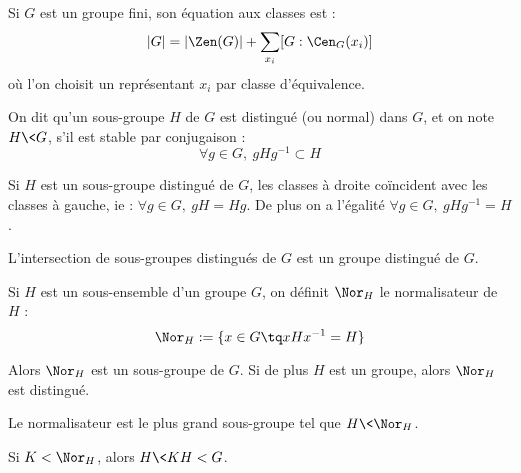 \begin{defi}
 
Si $G$ est un groupe fini, son équation aux classes est :
\begin{displaymath} |G| = |\Zen(G)| + \sum_{x_i} [G : \Cen_G(x_i)]
\end{displaymath}
où l'on choisit un représentant $x_i$ par classe d'équivalence.
\end{defi}

\begin{defi}
 
On dit qu'un sous-groupe $H$ de $G$ est distingué (ou normal) dans $G$, et on
note $H \< G$, s'il est stable par conjugaison :
\begin{displaymath} \forall g\in G,\ gHg^{-1} \subset H \end{displaymath}
\end{defi}

\begin{prop}
 
Si $H$ est un sous-groupe distingué de $G$, les classes à droite coïncident
avec les classes à gauche, ie : $\forall g\in G,\ gH = Hg$. De plus on a
l'égalité $\forall g\in G,\ gHg^{-1} = H$.
\end{prop}

\begin{prop}
 
L'intersection de sous-groupes distingués de $G$ est un groupe distingué de $G$.
\end{prop}

\begin{defitheo}[Normalisateur]
 
Si $H$ est un sous-ensemble d'un groupe $G$, on définit $\Nor_H$ le
normalisateur de $H$ :
\begin{displaymath}\Nor_H := \{x\in G \tq xHx^{-1} = H\} \end{displaymath}

Alors $\Nor_H$ est un sous-groupe de $G$. Si de plus $H$ est un groupe, alors
$\Nor_H$ est distingué.

Le normalisateur est le plus grand sous-groupe tel que $H \< \Nor_H$.
\end{defitheo}

\begin{prop}
 
Si $K < \Nor_H$, alors $H \< KH < G$.
\end{prop}


